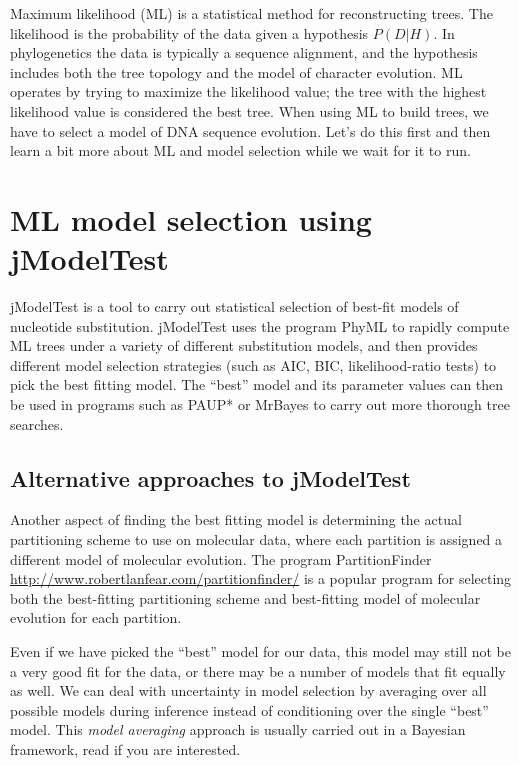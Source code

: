 \documentclass[11pt]{article}
\begin{document}
Maximum likelihood (ML) is a statistical method for reconstructing trees.  
The likelihood is the probability of the data given a hypothesis $P(D|H)$.
In phylogenetics the data is typically a sequence alignment, and the hypothesis includes
both the tree topology and the model of character evolution.
ML operates by trying to maximize the
likelihood value;
the tree with the highest likelihood value is considered the best tree.  
When using ML to build trees, 
we have to select a model of DNA sequence evolution. 
Let's do this first and then learn a bit more about ML and model selection while we wait for it to run.

\section{ML model selection using jModelTest}

jModelTest \citep{darriba2012jmodeltest} is a tool to carry out statistical selection of best-fit models of nucleotide substitution.
jModelTest uses the program PhyML \citep{guindon2010new}
to rapidly compute ML trees under a variety of different substitution models,
and then provides different model selection strategies (such as AIC, BIC, likelihood-ratio tests)
to pick the best fitting model.
The ``best'' model and its parameter values can then be used in 
programs such as PAUP* or MrBayes to carry out more thorough tree searches.

\subsection{Alternative approaches to jModelTest}

Another aspect of finding the best fitting model is
determining the actual partitioning scheme to use on molecular data,
where each partition is assigned a different model of molecular evolution.
The program PartitionFinder \url{http://www.robertlanfear.com/partitionfinder/} 
is a popular program for selecting both 
the best-fitting partitioning
scheme and best-fitting model of molecular evolution for each partition.

Even if we have picked the ``best'' model for our data, this model may still not be a very good
fit for the data, or there may be a number of models that fit equally as well.
We can deal with uncertainty in model selection by averaging over all possible
models during inference instead of conditioning over the single ``best'' model.
This \textit{model averaging} approach is usually carried out in a Bayesian framework,
read \citet{huelsenbeck2004bayesian} if you are interested.
\end{document}
